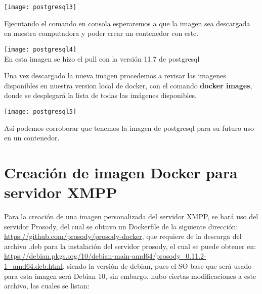 \documentclass[10pt,letterpaper]{article}
\begin{document}
\begin{center}
\centering
\texttt{[image: postgresql3]}
\end{center}

Ejecutando el comando en consola esperaremos a que la imagen sea descargada en nuestra computadora y poder crear un contenedor con este.

\begin{center}
\texttt{[image: postgresql4]}\\
En esta imagen se hizo el pull con la versión 11.7 de postgresql
\end{center}

Una vez descargado la nueva imagen procedemos a revisar las imagenes disponibles en nuestra version local de docker, con el comando \textbf{docker images}, donde se desplegará la lista de todas las imágenes disponibles.

\begin{center}
\texttt{[image: postgresql5]}
\end{center}

Así podemos corroborar que tenemos la imagen de postgresql para su futuro uso en un contenedor.

\section{Creación de imagen Docker para servidor XMPP}

Para la creación de una imagen personalizada del servidor XMPP, se hará uso del servidor Prosody, del cual se obtuvo un Dockerfile de la siguiente dirección: \url{https://github.com/prosody/prosody-docker}, que requiere de la descarga del archivo .deb para la instalación del servidor prosody, el cual se puede obtener en: \url{https://debian.pkgs.org/10/debian-main-amd64/prosody_0.11.2-1_amd64.deb.html}, siendo la versión de debian, pues el SO base que será usado para esta imagen será Debian 10, sin embargo, hubo ciertas modificaciones a este archivo, las cuales se listan:
\end{document}
